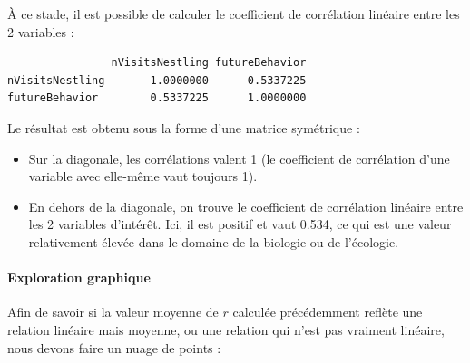 \documentclass[a4paperpaper,]{article}
\newenvironment{Shaded}{\begin{snugshade}}{\end{snugshade}}
\newcommand{\DataTypeTok}[1]{\textcolor[rgb]{0.00,0.34,0.68}{#1}}
\newcommand{\KeywordTok}[1]{\textcolor[rgb]{0.12,0.11,0.11}{\textbf{#1}}}
\newcommand{\NormalTok}[1]{\textcolor[rgb]{0.12,0.11,0.11}{#1}}
\newcommand{\OperatorTok}[1]{\textcolor[rgb]{0.12,0.11,0.11}{#1}}
\newcommand{\StringTok}[1]{\textcolor[rgb]{0.75,0.01,0.01}{#1}}
\providecommand{\tightlist}{%
  \setlength{\itemsep}{0pt}\setlength{\parskip}{0pt}}
\let\oldparagraph\paragraph
\renewcommand{\paragraph}[1]{\oldparagraph{#1}\mbox{}}
\begin{document}
À ce stade, il est possible de calculer le coefficient de corrélation linéaire entre les 2 variables :

\begin{Shaded}
\end{Shaded}

\begin{verbatim}
                nVisitsNestling futureBehavior
nVisitsNestling       1.0000000      0.5337225
futureBehavior        0.5337225      1.0000000
\end{verbatim}

Le résultat est obtenu sous la forme d'une matrice symétrique :

\begin{itemize}
\tightlist
\item
  Sur la diagonale, les corrélations valent 1 (le coefficient de corrélation d'une variable avec elle-même vaut toujours 1).
\item
  En dehors de la diagonale, on trouve le coefficient de corrélation linéaire entre les 2 variables d'intérêt. Ici, il est positif et vaut 0.534, ce qui est une valeur relativement élevée dans le domaine de la biologie ou de l'écologie.
\end{itemize}

\hypertarget{exploration-graphique-4}{%
\paragraph{Exploration graphique}\label{exploration-graphique-4}}

Afin de savoir si la valeur moyenne de \(r\) calculée précédemment reflète une relation linéaire mais moyenne, ou une relation qui n'est pas vraiment linéaire, nous devons faire un nuage de points :

\begin{Shaded}
\end{Shaded}
\end{document}
